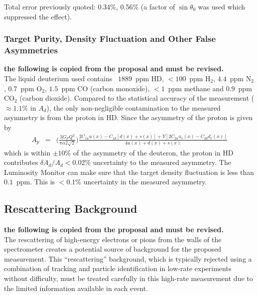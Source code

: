 Total error previously quoted: 0.34\%, 0.56\% (a factor of $\sin\theta_0$ was used which suppressed the effect).

\subsubsection{Target Purity, Density Fluctuation and Other False Asymmetries}
\label{sec:syst_purity}

{\bf the following is copied from the proposal and must be revised.}\\

The liquid deuterium used contains~\cite{target:purity} $1889$~ppm 
HD, $<100$~ppm H$_2$, $4.4$~ppm N$_2$, $0.7$~ppm O$_2$, $1.5$~ppm CO 
(carbon monoxide), $<1$~ppm methane and $0.9$~ppm CO$_2$ (carbon dioxide).  
Compared to the statistical accuracy of the measurement ($\approx 1.1\%$ 
in $A_d$), the only non-negligible contamination to the measured asymmetry 
is from the proton in HD. Since the asymmetry of the proton is given 
by~\cite{exp:e149_new}
\begin{eqnarray}
 A_p &=& \big(\frac{3G_F Q^2}{\pi\alpha 2\sqrt{2}}\big)
	\frac{2C_{1u}u(x)-C_{1d}[d(x)+s(x)]+Y[2C_{2u}u_v(x)-C_{2d}d_v(x)]}
	     {4u(x)+d(x)+s(x)} \label{equ:Asymp}
\end{eqnarray}
which is within $\pm 10\%$ of the asymmetry of the deuteron, the proton 
in HD contributes $\delta{A_d}/A_d<0.02\%$ uncertainty to the measured asymmetry.
%
The Luminosity Monitor can make sure that the target density fluctuation is 
less than $0.1$~ppm.  This is $<0.1\%$ uncertainty in the measured asymmetry.


\subsection{Rescattering Background}\label{sec:syst_background}

{\bf the following is copied from the proposal and must be revised.}\\

The rescattering of high-energy electrons or pions from the walls of 
the spectrometer creates a potential source of background for the proposed 
measurement.   This ``rescattering'' background, which is typically 
rejected using a combination of tracking and particle 
identification in low-rate experiments without difficulty, must be treated
carefully in this high-rate measurement due to the limited information 
available in each event. 

